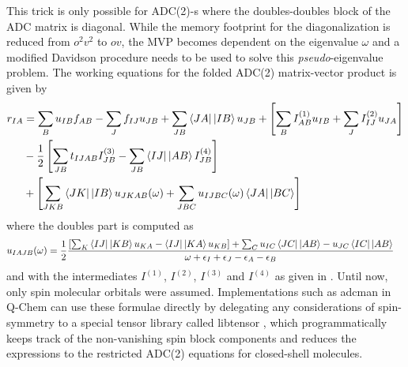 \noindent This trick is only possible for ADC(2)-s where the doubles-doubles block of the ADC matrix is diagonal. While the memory footprint for the diagonalization is reduced from $o^2v^2$ to $ov$, the MVP becomes dependent on the eigenvalue $\omega$ and a modified Davidson procedure needs to be used to solve this \emph{pseudo}-eigenvalue problem. The working equations for the folded ADC(2) matrix-vector product is given by \cite{Wor2009}
\begin{align}
\begin{split}
r_{IA} &= \sum_B u_{IB} f_{AB} - \sum_J f_{IJ} u_{JB} + \sum_{JB} \sbra{JA}\sket{IB} u_{JB} + \left[ \sum_B I^{(1)}_{AB} u_{IB} + \sum_J I^{(2)}_{IJ} u_{JA}\right] \\
&- \frac{1}{2} \left[ \sum_{JB} t_{IJAB} I^{(3)}_{JB} - \sum_{JB} \sbra{IJ}\sket{AB} I^{(4)}_{JB} \right] \\
&+ \left[\sum_{JKB} \sbra{JK}\sket{IB} u_{JKAB}(\omega) + \sum_{JBC} u_{IJBC}(\omega) \sbra{JA}\sket{BC}\right]
\end{split}
\end{align}
\noindent where the doubles part is computed as
\begin{align}
u_{IAJB}(\omega) &= \frac{1}{2} \frac{\left[\sum_K \sbra{IJ}\sket{KB}u_{KA} - \sbra{IJ}\sket{KA} u_{KB}\right] + \sum_C u_{IC} \sbra{JC}\sket{AB} - u_{JC} \sbra{IC}\sket{AB}}{\omega + \eps_I + \eps_J - \eps_A - \eps_B}
\end{align}
\noindent and with the intermediates $I^{(1)}$, $I^{(2)}$, $I^{(3)}$ and $I^{(4)}$ as given in \cite{Wor2009}. Until now, only spin molecular orbitals were assumed. Implementations such as adcman in Q-Chem \cite{Sha2006} can use these formulae directly by delegating any considerations of spin-symmetry to a special tensor library called libtensor \cite{Epi2013}, which programmatically keeps track of the non-vanishing spin block components and reduces the expressions to the restricted ADC(2) equations for closed-shell molecules.

